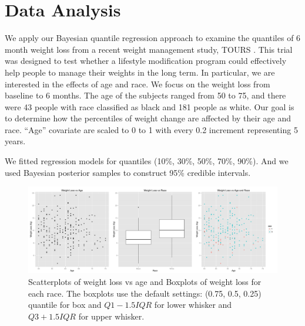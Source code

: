 \documentclass[12pt]{article}
\begin{document}
\section{Data Analysis}
\label{ch2:sec:tours}
We apply our Bayesian quantile regression approach to
examine the quantiles of 6 month weight loss from a recent weight
management study, TOURS \citep{perri2008extended}.  This trial was designed
to test whether a lifestyle modification program could effectively
help people to manage their weights in the long term.  In particular,
we are interested in the effects of age and race.  We focus on the
weight loss from baseline to 6 months. The age of the subjects ranged
from 50 to 75, and there were 43 people with race classified as black
and 181 people as white.  Our goal is to determine how the percentiles
of weight change are affected by their age and race.  ``Age''
covariate are scaled to 0 to 1 with every 0.2 increment representing 5
years.

We fitted regression models for quantiles (10\%, 30\%, 50\%, 70\%,
90\%). And we used Bayesian posterior samples to construct 95\%
credible intervals.

\begin{figure}[htbp]
  \centerline{\includegraphics[scale = 0.4]{weight-age-race}}
  \caption[]{\label{ch2:fig:tours} Scatterplots of weight loss vs age and
    Boxplots of weight loss for each race.  The boxplots use the
    default settings: (0.75, 0.5, 0.25) quantile for box and
    $Q1-1.5IQR$ for lower whisker and $Q3+1.5IQR$ for upper whisker. }
\end{figure}
\end{document}
